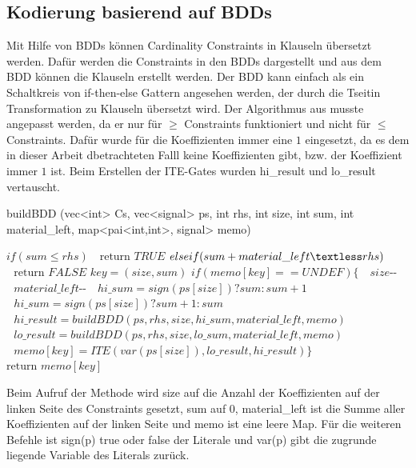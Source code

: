 \documentclass[a4,abstract=on]{scrartcl}
\begin{document}
	\subsection{Kodierung basierend auf BDDs}
Mit Hilfe von BDDs können Cardinality Constraints in Klauseln übersetzt werden. Dafür werden die Constraints in den BDDs dargestellt und aus dem BDD können die Klauseln erstellt werden. Der BDD kann einfach als ein Schaltkreis von if-then-else Gattern angesehen werden, der durch die Tseitin Transformation zu Klauseln übersetzt wird. Der Algorithmus aus \cite[][Seite 11]{niklasse} musste angepasst werden, da er nur für $\geq$ Constraints funktioniert und nicht für $\leq$ Constraints. Dafür wurde für die Koeffizienten  immer eine $1$ eingesetzt, da es dem in dieser Arbeit dbetrachteten Falll keine Koeffizienten gibt, bzw. der Koeffizient immer $1$ ist. Beim Erstellen der ITE-Gates wurden hi\_result und lo\_result vertauscht.\\

\begin{algorithm}
\caption{buildBDD (vec<int> Cs, vec<signal> ps, int rhs, int size, int sum, int material\_left, map<pai<int,int>, signal> memo)}
\label{alg:buildBDD}
\begin{algorithmic}

\State $\text{}if (sum \leq rhs)$
\State $\text{~~return } TRUE$
\State $\text{}else if (sum + material\_left \textless rhs)$
\State $\text{~~return } FALSE$
\State $\text{} key = (size, sum)$
\State $\text{}if (memo[key] == UNDEF) \{$
\State $\text{~~} size\text{-{}-}$
\State $\text{~~} material\_left \text{-{}-}$
\State $\text{~~} hi\_sum = sign(ps[size]) ? sum : sum + 1$
\State $\text{~~} hi\_sum = sign(ps[size]) ? sum + 1 : sum$
\State $\text{~~} hi\_result = buildBDD(ps , rhs, size, hi\_sum, material\_left, memo)$
\State $\text{~~} lo\_result = buildBDD(ps , rhs, size, lo\_sum, material\_left, memo)$
\State $\text{~~} memo[key] = ITE(var(ps[size]), lo\_result, hi\_result)\}$
\State $\text{return }memo[key]$
\end{algorithmic}
\end{algorithm}

Beim Aufruf der Methode wird size auf die Anzahl der Koeffizienten auf der linken Seite des Constraints gesetzt, sum auf $0$, material\_left ist die Summe aller Koeffizienten auf der linken Seite und memo ist eine leere Map. Für die weiteren Befehle ist sign(p) true oder false der Literale und var(p) gibt die zugrunde liegende Variable des Literals zurück.\\
\end{document}
